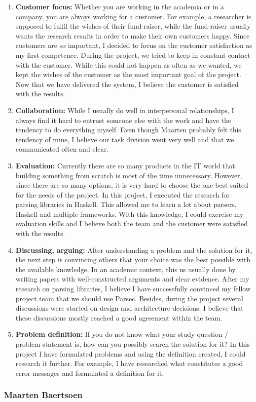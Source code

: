 \begin{enumerate}
    \item \textbf{Customer focus:}
        Whether you are working in the academia or in a company, you are always working for a customer.
        For example, a researcher is supposed to fulfil the wishes of their fund-raiser, while the fund-raiser usually wants the research results in order to make their own customers happy.
        Since customers are so important, I decided to focus on the customer satisfaction as my first competence.
        During the project, we tried to keep in constant contact with the customer.
        While this could not happen as often as we wanted, we kept the wishes of the customer as the most important goal of the project.
        Now that we have delivered the system, I believe the customer is satisfied with the results.
        
    \item \textbf{Collaboration:}
        While I usually do well in interpersonal relationships, I always find it hard to entrust someone else with the work and have the tendency to do everything myself.
        Even though Maarten probably felt this tendency of mine, I believe our task division went very well and that we communicated often and clear.
    
    \item \textbf{Evaluation:}
        Currently there are so many products in the IT world that building something from scratch is most of the time unnecessary.
        However, since there are so many options, it is very hard to choose the one best suited for the needs of the project.
        In this project, I executed the research for parsing libraries in Haskell.
        This allowed me to learn a lot about parsers, Haskell and multiple frameworks.
        With this knowledge, I could exercise my evaluation skills and I believe both the team and the customer were satisfied with the results.
    
    \item \textbf{Discussing, arguing:}
        After understanding a problem and the solution for it, the next step is convincing others that your choice was the best possible with the available knowledge.
        In an academic context, this us usually done by writing papers with well-constructed arguments and clear evidence.
        After my research on parsing libraries, I believe I have successfully convinced my fellow project team that we should use Parsec.
        Besides, during the project several discussions were started on design and architecture decisions.
        I believe that these discussions mostly reached a good agreement within the team.

    \item \textbf{Problem definition:}
        If you do not know what your study question / problem statement is, how can you possibly search the solution for it?
        In this project I have formulated problems and using the definition created, I could research it further.
        For example, I have researched what constitutes a good error messages and formulated a definition for it.
\end{enumerate}

\subsubsection{Maarten Baertsoen}
